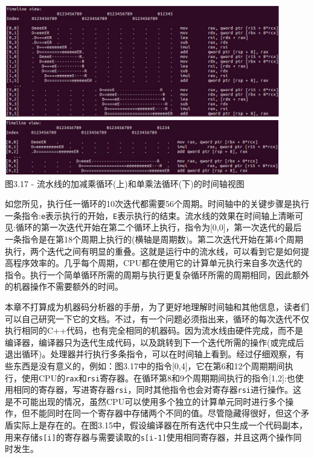 \begin{center}
\includegraphics[width=0.9\textwidth]{content/1/chapter3/images/17.jpg}\\
图3.17 - 流水线的加减乘循环(上)和单乘法循环(下)的时间轴视图
\end{center}

如您所见，执行任一循环的10次迭代都需要56个周期。时间轴中的关键步骤是执行一条指令:\texttt{e}表示执行的开始，\texttt{E}表示执行的结束。流水线的效果在时间轴上清晰可见:循环的第一次迭代开始在第二个循环上执行，指令为[0,0]，第一次迭代的最后一条指令是在第18个周期上执行的(横轴是周期数)。第二次迭代开始在第4个周期执行，两个迭代之间有明显的重叠。这就是运行中的流水线，可以看到它是如何提高程序效率的。几乎每个周期，CPU都在使用它的计算单元执行来自多次迭代的指令。执行一个简单循环所需的周期与执行更复杂循环所需的周期相同，因此额外的机器操作不需要额外的时间。

本章不打算成为机器码分析器的手册，为了更好地理解时间轴和其他信息，读者们可以自己研究一下它的文档。不过，有一个问题必须指出来，循环的每次迭代不仅执行相同的C++代码，也有完全相同的机器码。因为流水线由硬件完成，而不是编译器，编译器只为迭代生成代码，以及跳转到下一个迭代所需的操作(或完成后退出循环)。处理器并行执行多条指令，可以在时间轴上看到。经过仔细观察，有些东西是没有意义的，例如：图3.17中的指令[0,4]，它在第6和12个周期期间执行，使用CPU的\texttt{rax}和\texttt{rsi}寄存器。在循环第8和9个周期期间执行的指令[1,2]:也使用相同的寄存器，写进寄存器\texttt{rsi}，同时其他指令也会对寄存器\texttt{rsi}进行操作。这是不可能出现的情况，虽然CPU可以使用多个独立的计算单元同时进行多个操作，但不能同时在同一个寄存器中存储两个不同的值。尽管隐藏得很好，但这个矛盾实际上是存在的。在图3.15中，假设编译器在所有迭代中只生成一个代码副本，用来存储\texttt{s[i]}的寄存器与需要读取的\texttt{s[i-1]}使用相同寄存器，并且这两个操作同时发生。

